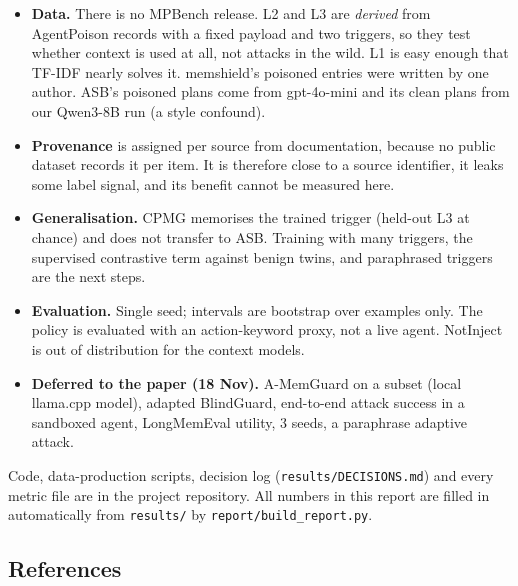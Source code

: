 \documentclass[
]{article}
\providecommand{\tightlist}{%
  \setlength{\itemsep}{0pt}\setlength{\parskip}{0pt}}
\begin{document}
\begin{itemize}
\tightlist
\item
  \textbf{Data.} There is no MPBench release. L2 and L3 are
  \emph{derived} from AgentPoison records with a fixed payload and two
  triggers, so they test whether context is used at all, not attacks in
  the wild. L1 is easy enough that TF-IDF nearly solves it. memshield's
  poisoned entries were written by one author. ASB's poisoned plans come
  from gpt-4o-mini and its clean plans from our Qwen3-8B run (a style
  confound).
\item
  \textbf{Provenance} is assigned per source from documentation, because
  no public dataset records it per item. It is therefore close to a
  source identifier, it leaks some label signal, and its benefit cannot
  be measured here.
\item
  \textbf{Generalisation.} CPMG memorises the trained trigger (held-out
  L3 at chance) and does not transfer to ASB. Training with many
  triggers, the supervised contrastive term against benign twins, and
  paraphrased triggers are the next steps.
\item
  \textbf{Evaluation.} Single seed; intervals are bootstrap over
  examples only. The policy is evaluated with an action-keyword proxy,
  not a live agent. NotInject is out of distribution for the context
  models.
\item
  \textbf{Deferred to the paper (18 Nov).} A-MemGuard on a subset (local
  llama.cpp model), adapted BlindGuard, end-to-end attack success in a
  sandboxed agent, LongMemEval utility, 3 seeds, a paraphrase adaptive
  attack.
\end{itemize}

Code, data-production scripts, decision log
(\texttt{results/DECISIONS.md}) and every metric file are in the project
repository. All numbers in this report are filled in automatically from
\texttt{results/} by \texttt{report/build\_report.py}.

\subsection{References}\label{references}
\end{document}
